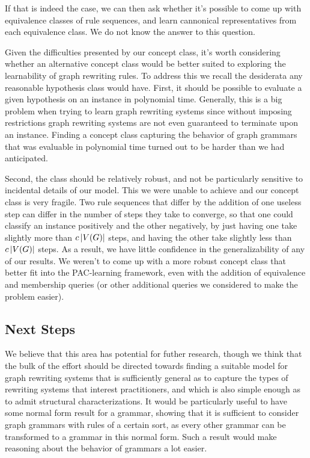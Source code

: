 \documentclass[]{article}
\begin{document}
If that is indeed the case, we can then ask whether it's possible to come up
with equivalence classes of rule sequences, and learn cannonical representatives
from each equivalence class. We do not know the answer to this question.

Given the difficulties presented by our concept class, it's worth considering
whether an alternative concept class would be better suited to exploring the
learnability of graph rewriting rules. To address this we recall the desiderata
any reasonable hypothesis class would have. First, it should be possible to
evaluate a given hypothesis on an instance in polynomial
time. Generally, this is a big problem when trying to learn graph
rewriting systems since without imposing restrictions graph rewriting
systems are not even guaranteed to terminate upon an instance.
Finding a concept class capturing the behavior of graph grammars that
was evaluable in polynomial time turned out to be harder than we had
anticipated.

Second, the class should be relatively robust, and not be
particularly sensitive to incidental details of our model. This we were unable
to achieve and our concept class is very fragile. Two rule sequences that
differ by the addition of one useless step can differ in the number of steps
they take to converge, so that one could classify an instance positively and the
other negatively, by just having one take slightly more than $c\left| V(G) \right|$
steps, and having the other take slightly less than $c\left| V(G) \right|$ steps. As a
result, we have little confidence in the generalizability of any of our results.
We weren't to come up with a more robust concept class that better fit into the
PAC-learning framework, even with the addition of equivalence and membership
queries (or other additional queries we considered to make the problem easier).

\subsection{Next Steps}

We believe that this area has potential for futher research, though we
think that the bulk of the effort should be directed towards finding a
suitable model for graph rewriting systems that is sufficiently
general as to capture the types of rewriting systems that interest
practitioners, and which is also simple enough as to admit structural
characterizations. It would be particularly useful to have some normal
form result for a grammar, showing that it is sufficient to consider
graph grammars with rules of a certain sort, as every other grammar
can be transformed to a grammar in this normal form. Such a result
would make reasoning about the behavior of grammars a lot easier.
\end{document}
